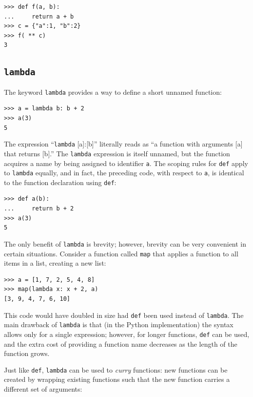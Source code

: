 \documentclass[justified, sixbynine]{tufte-book}
\def\ft{\small\tt}
\theoremstyle{plain}%
\newtheorem * {corollary}{Corollary}
\theoremstyle{definition}
\theoremstyle{remark}
\newtheorem * {remark}{Remark}
\newtheorem * {note}{Note}
\begin{document}
\begin{fullwidth}
\begin{lstlisting}
>>> def f(a, b):
...     return a + b
>>> c = {"a":1, "b":2}
>>> f( ** c)
3
\end{lstlisting}

\goodbreak\subsection{{\ft lambda}}


The keyword {\ft lambda} provides a way to define a short unnamed function:
\begin{lstlisting}
>>> a = lambda b: b + 2
>>> a(3)
5
\end{lstlisting}

The expression ``{\ft lambda} [a]:[b]'' literally reads as ``a function with arguments [a] that returns [b].'' The {\ft lambda} expression is itself unnamed, but the function acquires a name by being assigned to identifier {\ft a}.  The scoping rules for {\ft def} apply to {\ft lambda} equally, and in fact, the preceding code, with respect to {\ft a}, is identical to the function declaration using {\ft def}:

\begin{lstlisting}
>>> def a(b):
...     return b + 2
>>> a(3)
5
\end{lstlisting}

The only benefit of {\ft lambda} is brevity; however, brevity can be very convenient in certain situations.  Consider a function called {\ft map} that applies a function to all items in a list, creating a new list:

\begin{lstlisting}
>>> a = [1, 7, 2, 5, 4, 8]
>>> map(lambda x: x + 2, a)
[3, 9, 4, 7, 6, 10]
\end{lstlisting}
This code would have doubled in size had {\ft def} been used instead of {\ft lambda}. The main drawback of {\ft lambda} is that (in the Python implementation) the syntax allows only for a single expression; however, for longer functions, {\ft def} can be used, and the extra cost of providing a function name decreases as the length of the function grows.


Just like {\ft def}, {\ft lambda} can be used to {\it curry} functions: new functions can be created by wrapping existing functions such that the new function carries a different set of arguments:


\end{fullwidth}
\end{document}
